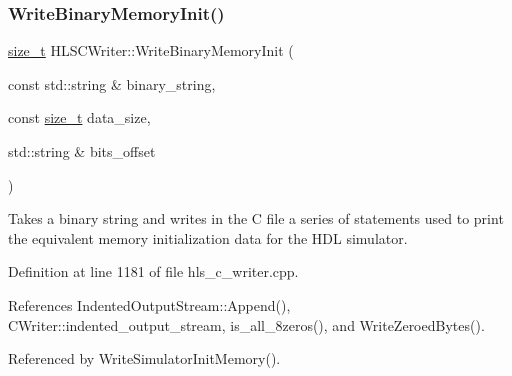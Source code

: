 \subsubsection{\texorpdfstring{Write\+Binary\+Memory\+Init()}{WriteBinaryMemoryInit()}}
{\footnotesize\ttfamily \hyperlink{tutorial__fpt__2017_2intro_2sixth_2test_8c_a7c94ea6f8948649f8d181ae55911eeaf}{size\+\_\+t} H\+L\+S\+C\+Writer\+::\+Write\+Binary\+Memory\+Init (\begin{DoxyParamCaption}\item[{const std\+::string \&}]{binary\+\_\+string,  }\item[{const \hyperlink{tutorial__fpt__2017_2intro_2sixth_2test_8c_a7c94ea6f8948649f8d181ae55911eeaf}{size\+\_\+t}}]{data\+\_\+size,  }\item[{std\+::string \&}]{bits\+\_\+offset }\end{DoxyParamCaption})\hspace{0.3cm}{\ttfamily [protected]}}



Takes a binary string and writes in the C file a series of statements used to print the equivalent memory initialization data for the H\+DL simulator. 



Definition at line 1181 of file hls\+\_\+c\+\_\+writer.\+cpp.



References Indented\+Output\+Stream\+::\+Append(), C\+Writer\+::indented\+\_\+output\+\_\+stream, is\+\_\+all\+\_\+8zeros(), and Write\+Zeroed\+Bytes().



Referenced by Write\+Simulator\+Init\+Memory().


